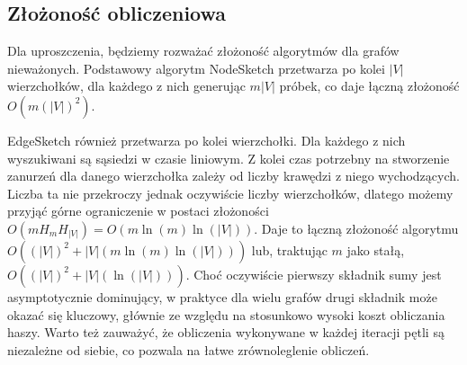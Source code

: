     \subsection{Złożoność obliczeniowa}
    Dla uproszczenia, będziemy rozważać złożoność algorytmów dla grafów nieważonych. Podstawowy algorytm NodeSketch przetwarza po kolei $|V|$ wierzchołków, dla każdego z nich generując $m|V|$ próbek, co daje łączną złożoność $O(m(|V|)^2)$.
    
     EdgeSketch również przetwarza po kolei wierzchołki. Dla każdego z nich wyszukiwani są sąsiedzi w czasie liniowym. Z kolei czas potrzebny na stworzenie zanurzeń dla danego wierzchołka zależy od liczby krawędzi z niego wychodzących. Liczba ta nie przekroczy jednak oczywiście liczby wierzchołków, dlatego możemy przyjąć górne ograniczenie w postaci złożoności $O(m H_m H_{|V|}) = O(m \ln(m) \ln(|V|))$. Daje to łączną złożoność algorytmu $O((|V|)^2 + |V|(m \ln(m) \ln(|V|)))$ lub, traktując $m$ jako stałą, $O((|V|)^2 + |V|(\ln(|V|)))$. Choć oczywiście pierwszy składnik sumy jest asymptotycznie dominujący, w praktyce dla wielu grafów drugi składnik może okazać się kluczowy, głównie ze względu na stosunkowo wysoki koszt obliczania haszy. Warto też zauważyć, że obliczenia wykonywane w każdej iteracji pętli są niezależne od siebie, co pozwala na łatwe zrównoleglenie obliczeń. 
     
     
